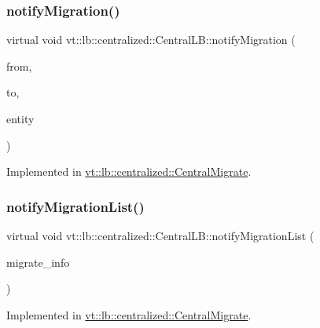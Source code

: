 \subsubsection{\texorpdfstring{notify\+Migration()}{notifyMigration()}}
{\footnotesize\ttfamily virtual void vt\+::lb\+::centralized\+::\+Central\+L\+B\+::notify\+Migration (\begin{DoxyParamCaption}\item[{\hyperlink{namespacevt_a866da9d0efc19c0a1ce79e9e492f47e2}{Node\+Type} const \&}]{from,  }\item[{\hyperlink{namespacevt_a866da9d0efc19c0a1ce79e9e492f47e2}{Node\+Type} const \&}]{to,  }\item[{\hyperlink{namespacevt_a92ec26fb6644cd0ba7eb0ee70c96bee5}{L\+B\+Entity\+Type} const \&}]{entity }\end{DoxyParamCaption})\hspace{0.3cm}{\ttfamily [pure virtual]}}



Implemented in \hyperlink{structvt_1_1lb_1_1centralized_1_1_central_migrate_a0800d9661c46ca7870d6045be68ddcd7}{vt\+::lb\+::centralized\+::\+Central\+Migrate}.

\mbox{\label{structvt_1_1lb_1_1centralized_1_1_central_l_b_a478778a92cd3a05b9aa4b2b417cb4a4b}} 
\subsubsection{\texorpdfstring{notify\+Migration\+List()}{notifyMigrationList()}}
{\footnotesize\ttfamily virtual void vt\+::lb\+::centralized\+::\+Central\+L\+B\+::notify\+Migration\+List (\begin{DoxyParamCaption}\item[{\hyperlink{structvt_1_1lb_1_1centralized_1_1_central_l_b_a8d393c0126180fb8cce2b881c23df44f}{Migrate\+Info\+Type} const \&}]{migrate\+\_\+info }\end{DoxyParamCaption})\hspace{0.3cm}{\ttfamily [pure virtual]}}



Implemented in \hyperlink{structvt_1_1lb_1_1centralized_1_1_central_migrate_a53c5eb03e2f6af93f207093683bbbd17}{vt\+::lb\+::centralized\+::\+Central\+Migrate}.

